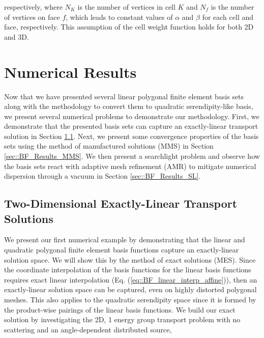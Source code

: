 \noindent respectively, where $N_K$ is the number of vertices in cell $K$ and $N_f$ is the number of vertices on face $f$, which leads to constant values of $\alpha$ and $\beta$ for each cell and face, respectively. This assumption of the cell weight function holds for both 2D and 3D.

\section{Numerical Results}
\label{sec::BF_Results}

Now that we have presented several linear polygonal finite element basis sets along with the methodology to convert them to quadratic serendipity-like basis, we present several numerical problems to demonstrate our methodology. First, we demonstrate that the presented basis sets can capture an exactly-linear transport solution in Section \ref{sec::BF_Results_Linear}. Next, we present some convergence properties of the basis sets using the method of manufactured solutions (MMS) in Section \ref{sec::BF_Results_MMS}. We then present a searchlight problem and observe how the basis sets react with adaptive mesh refinement (AMR) to mitigate numerical dispersion through a vacuum in Section \ref{sec::BF_Results_SL}.

\subsection{Two-Dimensional Exactly-Linear Transport Solutions}
\label{sec::BF_Results_Linear}

We present our first numerical example by demonstrating that the linear and quadratic polygonal finite element basis functions capture an exactly-linear solution space. We will show this by the method of exact solutions (MES). Since the coordinate interpolation of the basis functions for the linear basis functions requires exact linear interpolation (Eq. (\ref{eq::BF_linear_interp_affine})), then an exactly-linear solution space can be captured, even on highly distorted polygonal meshes. This also applies to the quadratic serendipity space since it is formed by the product-wise pairings of the linear basis functions. We build our exact solution by investigating the 2D, 1 energy group transport problem with no scattering and an angle-dependent distributed source,

